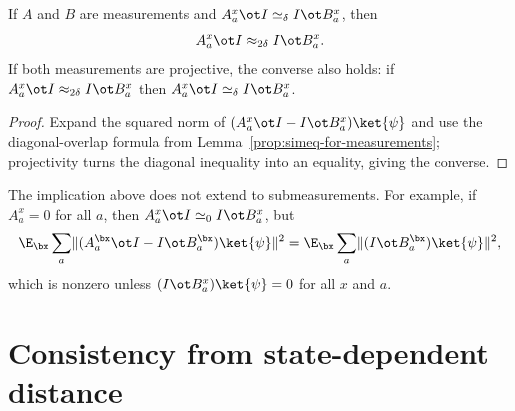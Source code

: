\begin{lemma}\label{prop:simeq-to-approx}
	\leanok
	If $A$ and $B$ are measurements and $A_a^x \ot I \simeq_\delta I \ot B_a^x$, then
	\[
		A_a^x \ot I \approx_{2\delta} I \ot B_a^x.
	\]
	If both measurements are projective, the converse also holds: if $A_a^x \ot I \approx_{2\delta} I \ot B_a^x$ then $A_a^x \ot I \simeq_\delta I \ot B_a^x$.
\end{lemma}
\begin{proof}
	\leanok
	Expand the squared norm of $(A_a^x \ot I - I \ot B_a^x)\ket{\psi}$ and use the diagonal-overlap formula from Lemma~\ref{prop:simeq-for-measurements}; projectivity turns the diagonal inequality into an equality, giving the converse.
\end{proof}

\begin{remark}\label{rem:simeq-not-approx-submeas}
	The implication above does not extend to submeasurements. For example, if
	$A_a^x=0$ for all $a$, then $A_a^x \ot I \simeq_0 I \ot B_a^x$, but
	\[
		\E_{\bx} \sum_a \lVert (A^{\bx}_a \ot I - I \ot B^{\bx}_a)\ket{\psi} \rVert^2
		= \E_{\bx} \sum_a \lVert (I \ot B^{\bx}_a)\ket{\psi} \rVert^2,
	\]
	which is nonzero unless $(I \ot B_a^x)\ket{\psi}=0$ for all $x$ and $a$.
\end{remark}

\section{Consistency from state-dependent distance}
\label{sec:consistency-from-state-dependent-distance}

